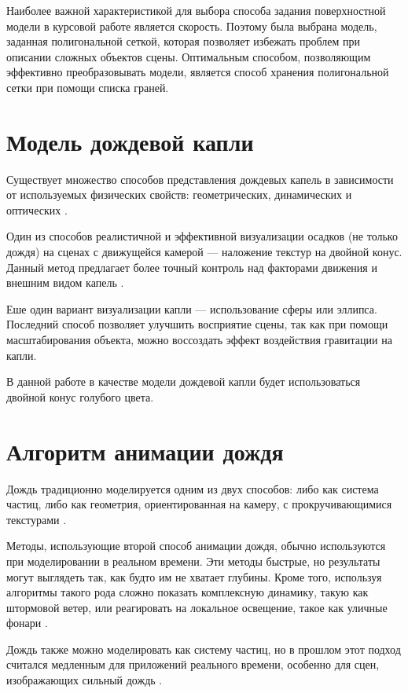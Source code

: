 Наиболее важной характеристикой для выбора способа задания поверхностной модели в курсовой работе является скорость. 
Поэтому была выбрана модель, заданная полигональной сеткой, которая позволяет избежать проблем при описании сложных объектов сцены. 
Оптимальным способом, позволяющим эффективно преобразовывать модели, является способ хранения полигональной сетки при помощи списка граней.

\section{Модель дождевой капли}
\label{sec:dropletmodel}

Существует множество способов представления дождевых капель в зависимости от используемых физических свойств: геометрических, динамических и оптических \cite{Wang}. 
    
Один из способов реалистичной и эффективной визуализации осадков (не только дождя) на сценах с движущейся камерой --- наложение текстур на двойной конус. 
Данный метод предлагает более точный контроль над факторами движения и внешним видом капель \cite{Wang}.

Еше один вариант визуализации капли --- использование сферы или эллипса. 
Последний способ позволяет улучшить восприятие сцены, так как при помощи масштабирования объекта, можно воссоздать эффект воздействия гравитации на капли.

В данной работе в качестве модели дождевой капли будет использоваться двойной конус голубого цвета.

\section{Алгоритм анимации дождя}

Дождь традиционно моделируется одним из двух способов: либо как система частиц, либо как геометрия, ориентированная на камеру, с прокручивающимися текстурами \cite[2]{Tariq2007}.

Методы, использующие второй способ анимации дождя, обычно используются при моделировании в реальном времени. 
Эти методы быстрые, но результаты могут выглядеть так, как будто им не хватает глубины. 
Кроме того, используя алгоритмы такого рода сложно показать комплексную динамику, такую как штормовой ветер, или реагировать на локальное освещение, такое как уличные фонари \cite[2]{Tariq2007}.

Дождь также можно моделировать как систему частиц, но в прошлом этот подход считался медленным для приложений реального времени, особенно для сцен, изображающих сильный дождь \cite[2]{Tariq2007}.

